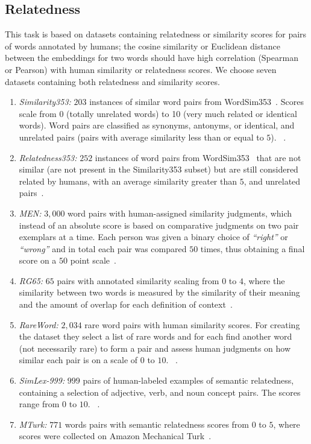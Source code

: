  \subsection{Relatedness}
This task is based on datasets containing relatedness or similarity scores for pairs of words annotated by humans; the cosine similarity or Euclidean distance between the embeddings for two words should have high correlation (Spearman or Pearson) with human similarity or relatedness scores. We choose seven datasets containing both relatedness and similarity scores. 
\begin{enumerate}
 \item \emph{Similarity353:} $203$ instances of similar word pairs from WordSim353~. Scores scale from 0 (totally unrelated words) to 10 (very much related or identical words). Word pairs are classified as synonyms, antonyms, or identical, and unrelated pairs (pairs with average similarity less than or equal to $5$). ~.
 \item \emph{Relatedness353:} $252$ instances of word pairs from WordSim353~ that are not similar (are not present in the Similarity353 subset) but are still considered related by humans, with an average similarity greater than $5$, and unrelated pairs~.
 \item \emph{MEN:} $3,000$ word pairs with human-assigned similarity judgments, which instead of an absolute score is based on comparative judgments on two pair exemplars at a time. Each person was given a binary choice of \emph{``right''} or \emph{``wrong''} and in total each pair was compared $50$ times, thus obtaining a final score on a $50$ point scale~.
 \item \emph{RG65:} $65$ pairs with annotated similarity scaling from $0$ to $4$, where the similarity between two words is measured by the similarity of their meaning and the
amount of overlap for each definition of context~.
 \item \emph{RareWord:} $2,034$ rare word pairs with human similarity scores. For creating the dataset they select a list of rare words and for each find another word (not necessarily rare) to form a pair and assess human judgments on how similar each pair is on a scale of $0$ to $10$. ~.
 \item \emph{SimLex-999:} $999$ pairs of human-labeled examples of semantic relatedness, containing a selection of adjective, verb, and noun concept pairs. The scores range from $0$ to $10$. ~.
 \item \emph{MTurk:} $771$ words pairs with semantic relatedness scores from
$0$ to $5$, where scores were collected on Amazon Mechanical Turk~.
\end{enumerate}
